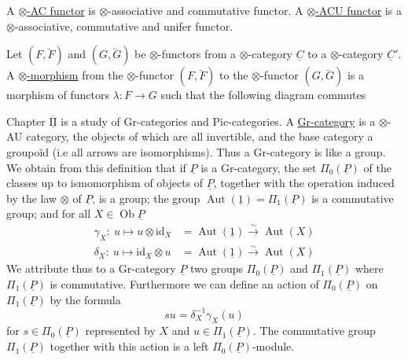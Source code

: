 A \uline{$\otimes$-AC functor} is  $\otimes$-associative and commutative functor. A \uline{$\otimes$-ACU functor} is a $\otimes$-associative, commutative and unifer functor.

Let $(F,\breve F)$ and $(G,\breve G)$ be $\otimes$-functors from a $\otimes$-category $\underline{C}$ to a $\otimes$-category $\underline{C}'$. A \uline{$\otimes$-morphism} from the $\otimes$-functor $(F,\breve F)$ to the $\otimes$-functor $(G,\breve G)$ is a morphism of functors $\lambda:F\to G$ such that the following diagram commutes

Chapter $\overline{\underline{\mathrm{II}}}$ is a study of Gr-categories and Pic-categories. A \uline{Gr-category} is a $\otimes$-AU category, the objects of which are all invertible, and the base category a groupoïd (i.e all arrows are isomorphisms). Thus a Gr-category is like a group. We obtain from this definition that if $\underline{P}$ is a Gr-category, the set $\Pi_0(\underline{P})$ of the classes up to ismomorphism of objects of $\underline{P}$, together with the operation induced by the law $\otimes$ of $\underline{P}$, is a group; the group $\operatorname{Aut}(\underline{1})=\Pi_1(\underline{P})$ is a commutative group; and for all $X\in\operatorname{Ob}\underline{P}$
\[
\begin{aligned}
\gamma_X:\ u\longmapsto u\otimes\mathrm{id}_X&=\operatorname{Aut}(\underline{1})\xrightarrow{\sim}\operatorname{Aut}(X)\\
\delta_X:\ u\longmapsto\mathrm{id}_X\otimes u&=\operatorname{Aut}(\underline{1})\xrightarrow{\sim}\operatorname{Aut}(X)
\end{aligned}
\]
We attribute thus to a Gr-category $\underline{P}$ two groups $\Pi_0(\underline{P})$ and $\Pi_1(\underline{P})$ where $\Pi_1(\underline{P})$ is commutative. Furthermore we can define an action of $\Pi_0(\underline{P})$ on $\Pi_1(\underline{P})$ by the formula
\[
su=\delta_X^{-1}\gamma_X(u)
\]
for $s\in\Pi_0(\underline{P})$ represented by $X$ and $u\in\Pi_1(\underline{P})$. The commutative group $\Pi_1(\underline{P})$ together with this action is a left $\Pi_0(\underline{P})$-module.

